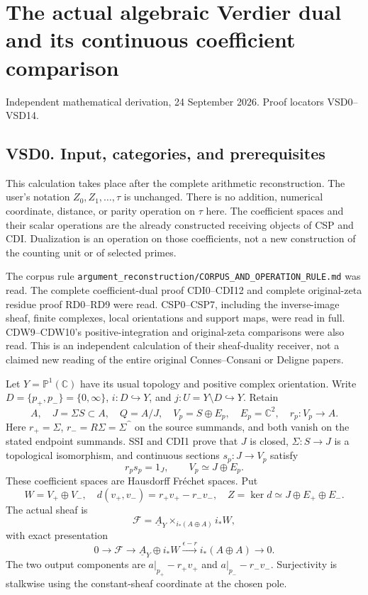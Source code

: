 \section{The actual algebraic Verdier dual and its continuous
coefficient
comparison}\label{the-actual-algebraic-verdier-dual-and-its-continuous-coefficient-comparison}

Independent mathematical derivation, 24 September 2026. Proof locators
VSD0--VSD14.

\subsection{VSD0. Input, categories, and
prerequisites}\label{vsd0.-input-categories-and-prerequisites}

This calculation takes place after the complete arithmetic
reconstruction. The user's notation \(Z_0,Z_1,\ldots,\tau\) is
unchanged. There is no addition, numerical coordinate, distance, or
parity operation on \(\tau\) here. The coefficient spaces and their
scalar operations are the already constructed receiving objects of CSP
and CDI. Dualization is an operation on those coefficients, not a new
construction of the counting unit or of selected primes.

The corpus rule
\nolinkurl{argument_reconstruction/CORPUS_AND_OPERATION_RULE.md} was
read. The complete coefficient-dual proof CDI0--CDI12 and complete
original-zeta residue proof RD0--RD9 were read. CSP0--CSP7, including
the inverse-image sheaf, finite complexes, local orientations and
support maps, were read in full. CDW9--CDW10's positive-integration and
original-zeta comparisons were also read. This is an independent
calculation of their sheaf-duality receiver, not a claimed new reading
of the entire original Connes--Consani or Deligne papers.

Let \(Y=\mathbb P^1(\mathbb C)\) have its usual topology and positive
complex orientation. Write \(D=\{p_+,p_-\}=\{0,\infty\}\),
\(i:D\hookrightarrow Y\), and \(j:U=Y\setminus D\hookrightarrow Y\).
Retain \[
A,\quad J=\Sigma S\subset A,\quad Q=A/J,\quad
V_p=S\oplus E_p,\quad E_p=\mathbb C^2,\quad r_p:V_p\to A.
\tag{VSD0.1}
\] Here \(r_+=\Sigma\), \(r_-=R\Sigma=\Sigma\widehat{\phantom f}\) on
the source summands, and both vanish on the stated endpoint summands.
SSI and CDI1 prove that \(J\) is closed, \(\Sigma:S\to J\) is a
topological isomorphism, and continuous sections \(s_p:J\to V_p\)
satisfy \[
r_ps_p=1_J,\qquad V_p\simeq J\oplus E_p.
\tag{VSD0.2}
\] These coefficient spaces are Hausdorff Fréchet spaces. Put \[
W=V_+\oplus V_-,\quad d(v_+,v_-)=r_+v_+-r_-v_-,
\quad Z=\ker d\simeq J\oplus E_+\oplus E_-.
\tag{VSD0.3}
\] The actual sheaf is \[
\mathscr F=\underline A_Y\times_{i_*(A\oplus A)}i_*W,
\tag{VSD0.4}
\] with exact presentation \[
0\to\mathscr F\to\underline A_Y\oplus i_*W
\xrightarrow{\epsilon-r}i_*(A\oplus A)\to0.
\tag{VSD0.5}
\] The two output components are \(a|_{p_+}-r_+v_+\) and
\(a|_{p_-}-r_-v_-\). Surjectivity is stalkwise using the constant-sheaf
coordinate at the chosen pole.

